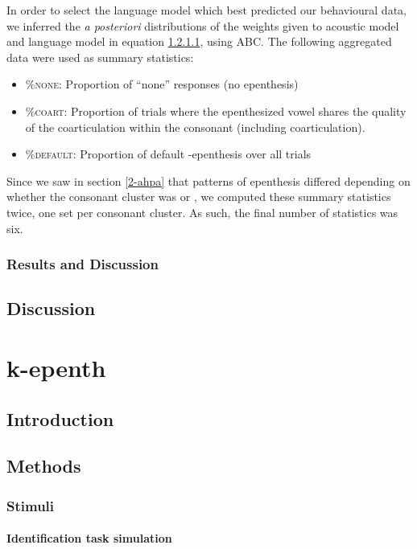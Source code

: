 {In order to select the language model which best predicted our behavioural data, we inferred the \textit{a posteriori} distributions of the weights given to acoustic model and language model in {\color{red}equation \ref{}}, using ABC. The following aggregated data were used as summary statistics:

\begin{itemize}
\item \textsc{\%none}: Proportion of ``none'' responses (no epenthesis)
\item \textsc{\%coart}: Proportion of trials where the epenthesized vowel shares the quality of the coarticulation within the consonant (including  coarticulation).
\item \textsc{\%default}: Proportion of default -epenthesis over all trials
\end{itemize}

Since we saw in section \ref{2-ahpa} that patterns of epenthesis differed depending on whether the consonant cluster was  or , we computed these summary statistics twice, one set per consonant cluster. As such, the final number of statistics was six. 

\subsubsection{Results and Discussion}
\subsection{Discussion}


\section{{\color{red}k-epenth}} \label{3-k-epenth}
\subsection{Introduction}
\subsection{Methods}
\subsubsection{Stimuli}
\paragraph{Identification task simulation}
}
